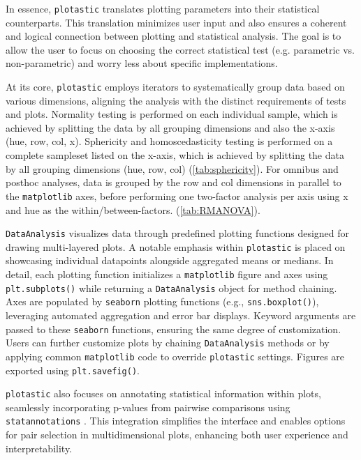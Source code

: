 In essence, \texttt{plotastic} translates plotting parameters into their
statistical counterparts. This translation minimizes user input and also
ensures a coherent and logical connection between plotting and
statistical analysis. The goal is to allow the user to focus on choosing
the correct statistical test (e.g. parametric vs. non-parametric) and
worry less about specific implementations.

At its core, \texttt{plotastic} employs iterators to systematically group data
based on various dimensions, aligning the analysis with the distinct
requirements of tests and plots. Normality testing is performed on each
individual sample, which is achieved by splitting the data by all
grouping dimensions and also the x-axis (hue, row, col, x). Sphericity
and homoscedasticity testing is performed on a complete sampleset listed
on the x-axis, which is achieved by splitting the data by all grouping
dimensions (hue, row, col)  (\autoref{tab:sphericity}). For omnibus and
posthoc analyses, data is grouped by the row and col dimensions in
parallel to the \texttt{matplotlib} axes, before performing one two-factor
analysis per axis using x and hue as the within/between-factors.
(\autoref{tab:RMANOVA}).

\texttt{DataAnalysis} visualizes data through predefined plotting functions
designed for drawing multi-layered plots. A notable emphasis within
\texttt{plotastic} is placed on showcasing individual datapoints alongside
aggregated means or medians. In detail, each plotting function
initializes a \texttt{matplotlib} figure and axes using \texttt{plt.subplots()} while
returning a \texttt{DataAnalysis} object for method chaining. Axes are
populated by \texttt{seaborn} plotting functions (e.g., \texttt{sns.boxplot()}),
leveraging automated aggregation and error bar displays. Keyword
arguments are passed to these \texttt{seaborn} functions, ensuring the same
degree of customization. Users can further customize plots
by chaining \texttt{DataAnalysis} methods or by applying common \texttt{matplotlib} code
to override \texttt{plotastic} settings. Figures are exported using
\texttt{plt.savefig()}.

\texttt{plotastic} also focuses on annotating statistical information within
plots, seamlessly incorporating p-values from pairwise comparisons using
\texttt{statannotations} \cite{charlierTrevismdStatannotationsV02022}. This
integration simplifies the interface and enables options for pair
selection in multidimensional plots, enhancing both user experience and
interpretability.

